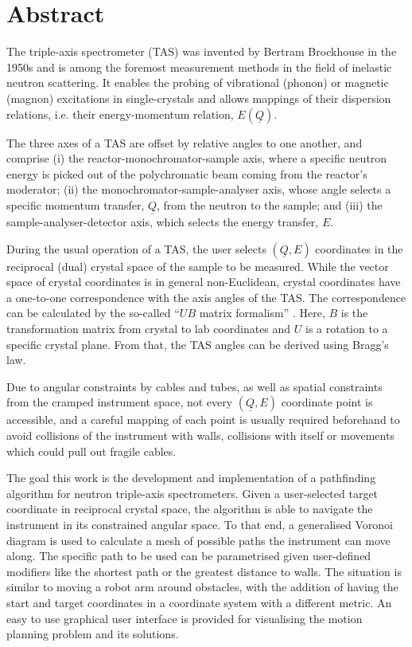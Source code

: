 %
%

\chapter*{Abstract}

The triple-axis spectrometer (TAS) \cite{Shirane2002} was invented by Bertram Brockhouse in the 1950s and
is among the foremost measurement methods in the field of inelastic neutron scattering. 
It enables the probing of vibrational (phonon) or magnetic (magnon) excitations in single-crystals and allows 
mappings of their dispersion relations, i.e. their energy-momentum relation, $E\left( \underline{Q} \right)$.

The three axes of a TAS are offset by relative angles to one another, and comprise 
(i) the reactor-monochromator-sample axis, where a specific neutron energy is picked out of the polychromatic 
beam coming from the reactor's moderator; 
(ii) the monochromator-sample-analyser axis, whose angle selects a specific momentum transfer, $\underline{Q}$, 
from the neutron to the sample; and 
(iii) the sample-analyser-detector axis, which selects the energy transfer, $E$.

During the usual operation of a TAS, the user selects $\left( \underline{Q}, E \right)$ coordinates
in the reciprocal (dual) crystal space of the sample to be measured. While the vector space of crystal coordinates
is in general non-Euclidean, crystal coordinates have a one-to-one correspondence with the axis angles 
of the TAS. The correspondence can be calculated by the so-called ``$UB$ matrix formalism'' \cite{Lumsden2005}. 
Here, $B$ is the transformation matrix from crystal to lab coordinates and $U$ is a rotation to a specific 
crystal plane. From that, the TAS angles can be derived using Bragg's law.

Due to angular constraints by cables and tubes, as well as spatial constraints from the cramped instrument space,
not every $\left( \underline{Q}, E \right)$ coordinate point is accessible, and a careful mapping of each point is
usually required beforehand to avoid collisions of the instrument with walls, collisions with itself or movements
which could pull out fragile cables.

The goal this work is the development and implementation of a pathfinding algorithm for
neutron triple-axis spectrometers.
Given a user-selected target coordinate in reciprocal crystal space,
the algorithm is able to navigate the instrument in its constrained angular space.
To that end, a generalised Voronoi diagram is used to calculate a mesh of possible paths
the instrument can move along. The specific path to be used can be parametrised given
user-defined modifiers like the shortest path or the greatest distance to walls.
The situation is similar to moving a robot arm around obstacles, with the addition of having
the start and target coordinates in a coordinate system with a different metric.
An easy to use graphical user interface is provided for visualising the motion planning
problem and its solutions.
